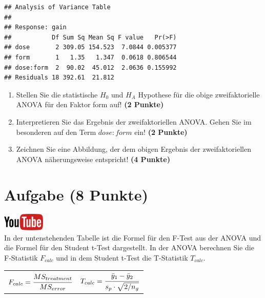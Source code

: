 \documentclass[a4paper, 10pt]{scrartcl}\usepackage[]{graphicx}\usepackage[]{xcolor}
\makeatletter
\newenvironment{kframe}{%
 \def\at@end@of@kframe{}%
 \ifinner\ifhmode%
  \def\at@end@of@kframe{\end{minipage}}%
  \begin{minipage}{\columnwidth}%
 \fi\fi%
 \def\FrameCommand##1{\hskip\@totalleftmargin \hskip-\fboxsep
 \colorbox{shadecolor}{##1}\hskip-\fboxsep
     \hskip-\linewidth \hskip-\@totalleftmargin \hskip\columnwidth}%
 \MakeFramed {\advance\hsize-\width
   \@totalleftmargin\z@ \linewidth\hsize
   \@setminipage}}%
 {\par\unskip\endMakeFramed%
 \at@end@of@kframe}
\newenvironment{knitrout}{}{} %
\makeatother
\begin{document}
\begin{knitrout}
\color{fgcolor}\begin{kframe}
\begin{verbatim}
## Analysis of Variance Table
## 
## Response: gain
##           Df Sum Sq Mean Sq F value   Pr(>F)
## dose       2 309.05 154.523  7.0844 0.005377
## form       1   1.35   1.347  0.0618 0.806544
## dose:form  2  90.02  45.012  2.0636 0.155992
## Residuals 18 392.61  21.812
\end{verbatim}
\end{kframe}
\end{knitrout}

\begin{enumerate}
\item Stellen Sie die statistische $H_0$ und $H_A$ Hypothese f{\"u}r die obige
  zweifaktorielle ANOVA f{\"u}r den Faktor form
  auf! \textbf{(2 Punkte)}
\item Interpretieren Sie das Ergebnis der zweifaktoriellen ANOVA. Gehen Sie
  im besonderen auf den Term $dose:form$ ein! \textbf{(2 Punkte)}
\item Zeichnen Sie eine Abbildung, der dem obigen Ergebnis der
  zweifaktoriellen ANOVA n{\"a}herungsweise entspricht! \textbf{(4 Punkte)}
\end{enumerate}
 
\clearpage

\section{Aufgabe \hfill (8 Punkte)}


\hfill\href{https://youtu.be/FjjJXkFJfIY}{\includegraphics[width =
  2cm]{img/youtube}}\\[1Ex]


In der untenstehenden Tabelle ist die Formel f{\"u}r den F-Test aus der ANOVA
und die Formel f{\"u}r den Student t-Test dargestellt. In der ANOVA berechnen
Sie die F-Statistik $F_{calc}$ und in dem Student t-Test die T-Statistik
$T_{calc}$.

\begin{center}
  \begin{tabular}{cc}
    $F_{calc} = \cfrac{MS_{treatment}}{MS_{error}}$ & $T_{calc} = \cfrac{\bar{y}_1 - \bar{y}_2}{s_p \cdot \sqrt{2/n_g}}$\\
  \end{tabular}
\end{center}
\end{document}
